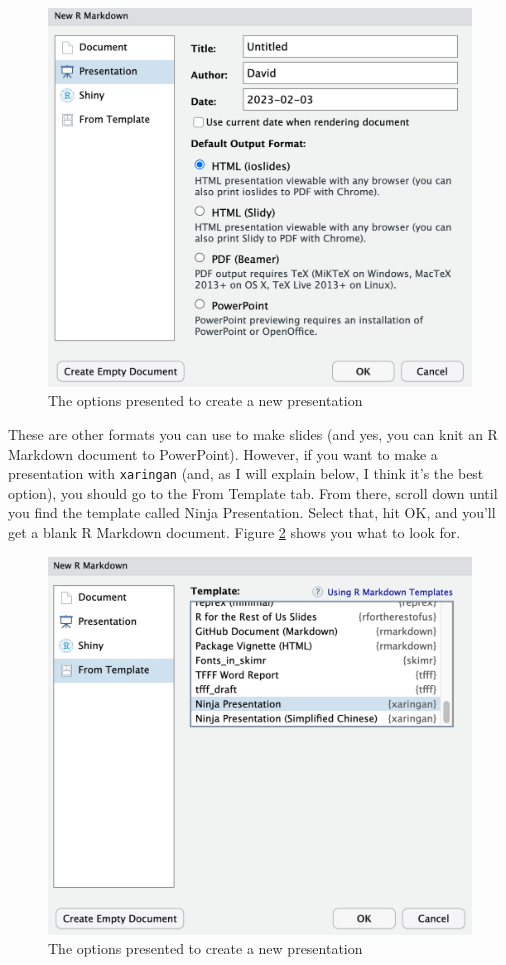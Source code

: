 \documentclass[
]{book}
\begin{document}
\begin{figure}
\includegraphics[width=1\linewidth]{assets/new-rmarkdown-presentation} \caption{The options presented to create a new presentation}\label{fig:new-rmarkdown-presentation}
\end{figure}

These are other formats you can use to make slides (and yes, you can knit an R Markdown document to PowerPoint). However, if you want to make a presentation with \texttt{xaringan} (and, as I will explain below, I think it's the best option), you should go to the From Template tab. From there, scroll down until you find the template called Ninja Presentation. Select that, hit OK, and you'll get a blank R Markdown document. Figure \ref{fig:new-xaringan-document} shows you what to look for.

\begin{figure}
\includegraphics[width=1\linewidth]{assets/new-xaringan-document} \caption{The options presented to create a new presentation}\label{fig:new-xaringan-document}
\end{figure}
\end{document}
